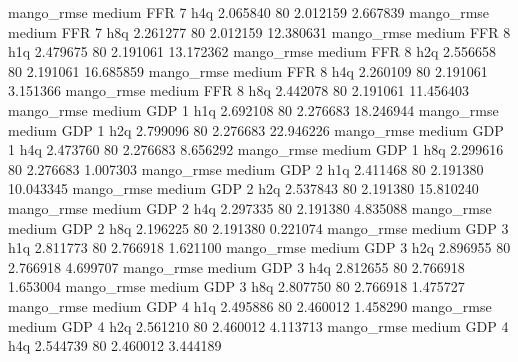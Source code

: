       mango_rmse     medium      FFR                 7                  h4q  2.065840 80       2.012159           2.667839
       mango_rmse     medium      FFR                 7                  h8q  2.261277 80       2.012159          12.380631
       mango_rmse     medium      FFR                 8                  h1q  2.479675 80       2.191061          13.172362
       mango_rmse     medium      FFR                 8                  h2q  2.556658 80       2.191061          16.685859
       mango_rmse     medium      FFR                 8                  h4q  2.260109 80       2.191061           3.151366
       mango_rmse     medium      FFR                 8                  h8q  2.442078 80       2.191061          11.456403
       mango_rmse     medium      GDP                 1                  h1q  2.692108 80       2.276683          18.246944
       mango_rmse     medium      GDP                 1                  h2q  2.799096 80       2.276683          22.946226
       mango_rmse     medium      GDP                 1                  h4q  2.473760 80       2.276683           8.656292
       mango_rmse     medium      GDP                 1                  h8q  2.299616 80       2.276683           1.007303
       mango_rmse     medium      GDP                 2                  h1q  2.411468 80       2.191380          10.043345
       mango_rmse     medium      GDP                 2                  h2q  2.537843 80       2.191380          15.810240
       mango_rmse     medium      GDP                 2                  h4q  2.297335 80       2.191380           4.835088
       mango_rmse     medium      GDP                 2                  h8q  2.196225 80       2.191380           0.221074
       mango_rmse     medium      GDP                 3                  h1q  2.811773 80       2.766918           1.621100
       mango_rmse     medium      GDP                 3                  h2q  2.896955 80       2.766918           4.699707
       mango_rmse     medium      GDP                 3                  h4q  2.812655 80       2.766918           1.653004
       mango_rmse     medium      GDP                 3                  h8q  2.807750 80       2.766918           1.475727
       mango_rmse     medium      GDP                 4                  h1q  2.495886 80       2.460012           1.458290
       mango_rmse     medium      GDP                 4                  h2q  2.561210 80       2.460012           4.113713
       mango_rmse     medium      GDP                 4                  h4q  2.544739 80       2.460012           3.444189

